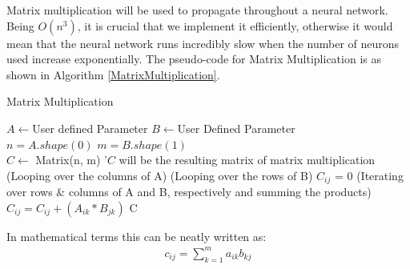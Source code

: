  \label{SMatrixMultiplication}
Matrix multiplication will be used to propagate throughout a neural network. Being $O(n^3)$, it is crucial that we implement it efficiently, otherwise it would mean that the neural network runs incredibly slow when the number of neurons used increase exponentially. The pseudo-code for Matrix Multiplication is as shown in Algorithm \ref{MatrixMultiplication}. 

\begin{algorithm}[H]
\caption{Matrix Multiplication}\label{MatrixMultiplication}
\begin{algorithmic}[1]
\State $A \gets $User defined Parameter
\State $B \gets $User Defined Parameter
\\
\State $n = A.shape(0)$
\State $m = B.shape(1)$
\\
\State $C \gets $ Matrix(n, m) '$C$ will be the resulting matrix of matrix multiplication
 (Looping over the columns of A)
 (Looping over the rows of B)
\State $C_{ij}$ = 0
 (Iterating over rows \& columns of A and B, respectively and summing the products)
\State $C_{ij} = C_{ij} + (A_{ik}*B_{jk})$
\EndFor
\EndFor
\EndFor
\Return C
\end{algorithmic}
\end{algorithm}
In mathematical terms this can be neatly written as:
\begin{align}
    c_{ij} = \sum_{k=1}^{m} a_{ik}b_{kj}
\end{align}
